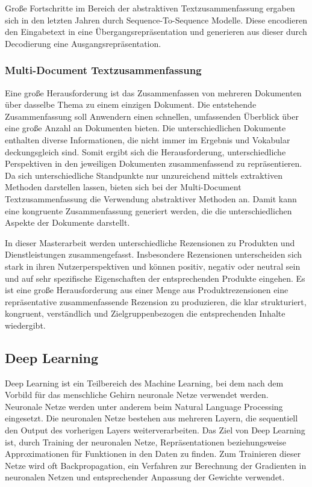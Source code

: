 Große Fortschritte im Bereich der abstraktiven Textzusammenfassung ergaben sich in den letzten Jahren durch Sequence-To-Sequence Modelle. Diese encodieren den Eingabetext in eine Übergangsrepräsentation und generieren aus dieser durch Decodierung eine Ausgangsrepräsentation.

\subsubsection{Multi-Document Textzusammenfassung}
Eine große Herausforderung ist das Zusammenfassen von mehreren Dokumenten über dasselbe Thema zu einem einzigen Dokument. 
Die entstehende Zusammenfassung soll Anwendern einen schnellen, umfassenden Überblick über eine große Anzahl an Dokumenten bieten. 
Die unterschiedlichen Dokumente enthalten diverse Informationen, die nicht immer im Ergebnis und Vokabular deckungsgleich sind. 
Somit ergibt sich die Herausforderung, unterschiedliche Perspektiven in den jeweiligen Dokumenten zusammenfassend zu repräsentieren.
Da sich unterschiedliche Standpunkte nur unzureichend mittels extraktiven Methoden darstellen lassen, bieten sich bei der Multi-Document Textzusammenfassung die Verwendung abstraktiver Methoden an.
Damit kann eine kongruente Zusammenfassung generiert werden, die die unterschiedlichen Aspekte der Dokumente darstellt.

In dieser Masterarbeit werden unterschiedliche Rezensionen zu Produkten und Dienstleistungen zusammengefasst. 
Insbesondere Rezensionen unterscheiden sich stark in ihren Nutzerperspektiven und können positiv, negativ oder neutral sein und auf sehr spezifische Eigenschaften der entsprechenden Produkte eingehen.
Es ist eine große Herausforderung aus einer Menge aus Produktrezensionen eine repräsentative zusammenfassende Rezension zu produzieren, die klar strukturiert, kongruent, verständlich und Zielgruppenbezogen die entsprechenden Inhalte wiedergibt.

\subsection{Deep Learning}
Deep Learning ist ein Teilbereich des Machine Learning, bei dem nach dem Vorbild für das menschliche Gehirn neuronale Netze verwendet werden. 
Neuronale Netze werden unter anderem beim Natural Language Processing eingesetzt. 
Die neuronalen Netze bestehen aus mehreren Layern, die sequentiell den Output des vorherigen Layers weiterverarbeiten. 
Das Ziel von Deep Learning ist, durch Training der neuronalen Netze, Repräsentationen beziehungsweise Approximationen für Funktionen in den Daten zu finden.
Zum Trainieren dieser Netze wird oft Backpropagation, ein Verfahren zur Berechnung der Gradienten in neuronalen Netzen und entsprechender Anpassung der Gewichte verwendet.

